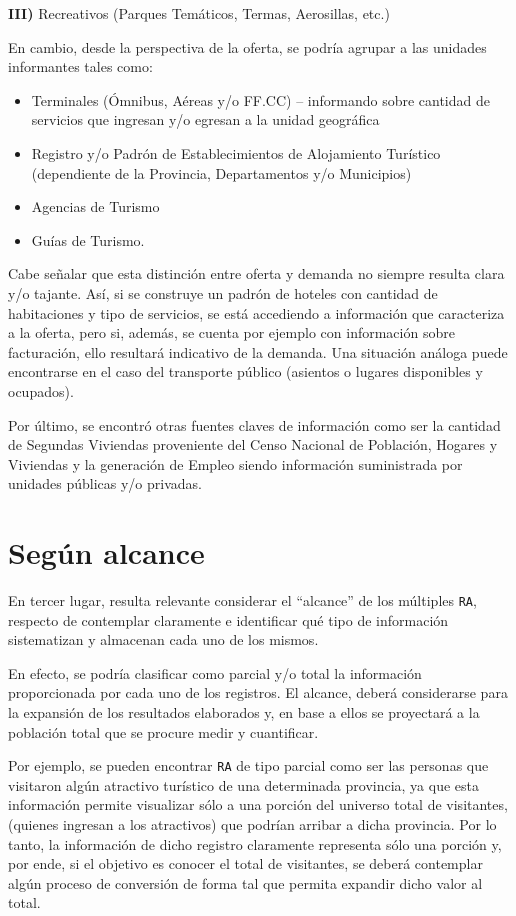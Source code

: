 \documentclass[
]{book}
\begin{document}
\textbf{III)} Recreativos (Parques Temáticos, Termas, Aerosillas, etc.)

En cambio, desde la perspectiva de la oferta, se podría agrupar a las unidades informantes tales como:

\begin{itemize}
\item
  Terminales (Ómnibus, Aéreas y/o FF.CC) -- informando sobre cantidad de servicios que ingresan y/o egresan a la unidad geográfica
\item
  Registro y/o Padrón de Establecimientos de Alojamiento Turístico (dependiente de la Provincia, Departamentos y/o Municipios)
\item
  Agencias de Turismo
\item
  Guías de Turismo.
\end{itemize}

Cabe señalar que esta distinción entre oferta y demanda no siempre resulta clara y/o tajante. Así, si se construye un padrón de hoteles con cantidad de habitaciones y tipo de servicios, se está accediendo a información que caracteriza a la oferta, pero si, además, se cuenta por ejemplo con información sobre facturación, ello resultará indicativo de la demanda. Una situación análoga puede encontrarse en el caso del transporte público (asientos o lugares disponibles y ocupados).

Por último, se encontró otras fuentes claves de información como ser la cantidad de Segundas Viviendas proveniente del Censo Nacional de Población, Hogares y Viviendas y la generación de Empleo siendo información suministrada por unidades públicas y/o privadas.

\hypertarget{seguxfan-alcance}{%
\section{Según alcance}\label{seguxfan-alcance}}

En tercer lugar, resulta relevante considerar el ``alcance'' de los múltiples \texttt{RA}, respecto de contemplar claramente e identificar qué tipo de información sistematizan y almacenan cada uno de los mismos.

En efecto, se podría clasificar como parcial y/o total la información proporcionada por cada uno de los registros. El alcance, deberá considerarse para la expansión de los resultados elaborados y, en base a ellos se proyectará a la población total que se procure medir y cuantificar.

Por ejemplo, se pueden encontrar \texttt{RA} de tipo parcial como ser las personas que visitaron algún atractivo turístico de una determinada provincia, ya que esta información permite visualizar sólo a una porción del universo total de visitantes, (quienes ingresan a los atractivos) que podrían arribar a dicha provincia. Por lo tanto, la información de dicho registro claramente representa sólo una porción y, por ende, si el objetivo es conocer el total de visitantes, se deberá contemplar algún proceso de conversión de forma tal que permita expandir dicho valor al total.
\end{document}
